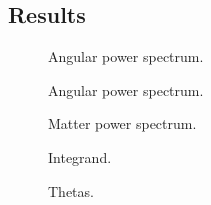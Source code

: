 \subsection{Results}\label{ssec:M4:results}


\begin{figure}[ht!]
    \caption{Angular power spectrum.}
    \label{fig:M4:results:cells}
\end{figure}


\begin{figure}[ht!]
    \caption{Angular power spectrum.}
    \label{fig:M4:results:cells_components}
\end{figure}


\begin{figure}[ht!]
    \caption{Matter power spectrum.}
    \label{fig:M4:results:matterPS_nk1000}
\end{figure}


\begin{figure}[ht!]
    \caption{Integrand.}
    \label{fig:M4:results:integrand_thetas}
\end{figure}


\begin{figure}[ht!]
    \caption{Thetas.}
    \label{fig:M4:results:thetas}
\end{figure}